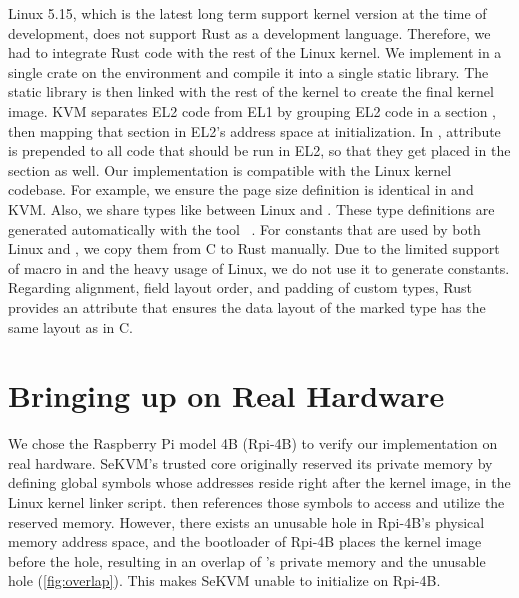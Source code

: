 Linux 5.15, which is the latest long term support kernel version at the time of
\rustsec{} development, does not support Rust as a development language.
Therefore, we had to integrate Rust code with the rest of the Linux kernel.
We implement \rustcore{} in a single crate on the  environment
and compile it into a single static library. The static library is then linked
with the rest of the kernel to create the final kernel image.
KVM separates EL2 code from EL1 by grouping EL2 code in a section
, then mapping that section in EL2's address space at
initialization.
In \rustcore{}, attribute \code{\#[link\_section = ".hyp.text"]} is prepended
to all code that should be run in EL2, so that they get placed in the
 section as well.
Our implementation is compatible with the Linux kernel codebase. For example, we
ensure the page size definition is identical in \rustcore{} and KVM.
Also, we share types like  between Linux and \rustcore{}.
These type definitions are generated automatically
with the tool ~\cite{bindgen}.
For constants that are used by both Linux and \rustcore{},
we copy them from C to Rust manually.
Due to the limited support of macro in 
and the heavy usage of Linux,
we do not use it to generate constants.
Regarding alignment, field layout order, and padding of custom types,
Rust provides an attribute \code{\#[repr\-(C)]}
that ensures the data layout of the marked type has the same layout as in C.

\section{Bringing up \rustsec{} on Real Hardware}

We chose the Raspberry Pi model 4B (Rpi-4B) to verify our implementation on
real hardware.
SeKVM's trusted core \secore{} originally reserved its private memory by
defining global symbols whose addresses reside right after the kernel image,
in the Linux kernel linker script.
\secore{} then references those symbols to access and utilize the reserved
memory.
However, there exists an unusable hole in Rpi-4B's physical memory address
space, and the bootloader of Rpi-4B places the kernel image before the hole,
resulting in an overlap of \secore{}'s private memory and the unusable hole
(\autoref{fig:overlap}). This makes SeKVM unable to initialize on Rpi-4B.

